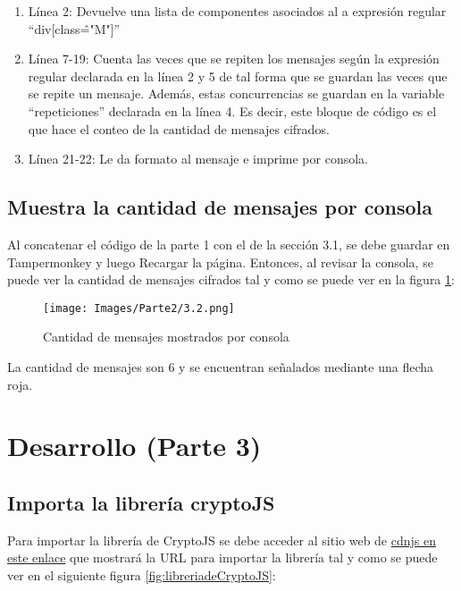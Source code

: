 \documentclass[letter,12pt]{article}
\begin{document}
\begin{enumerate}
    \item Línea 2: Devuelve una lista de componentes asociados al a expresión regular ``div[class\^ ="M"]''

    \item Línea 7-19: Cuenta las veces que se repiten los mensajes según la expresión regular declarada en la línea 2 y 5 de tal forma que se guardan las veces que se repite un mensaje. Además, estas concurrencias se guardan en la variable ``repeticiones'' declarada en la línea 4. Es decir, este bloque de código es el que hace el conteo de la cantidad de mensajes cifrados.

    \item Línea 21-22: Le da formato al mensaje e imprime por consola.
    
\end{enumerate}

\clearpage

\subsection{Muestra la cantidad de mensajes por consola}

Al concatenar el código de la parte 1 con el de la sección 3.1, se debe guardar en Tampermonkey y luego Recargar la página. Entonces, al revisar la consola, se puede ver la cantidad de mensajes cifrados tal y como se puede ver en la figura \ref{fig:Cantidaddemensajesmostradosporconsola}:

\begin{figure}[H]
    \centering
    \texttt{[image: Images/Parte2/3.2.png]}
    \caption{Cantidad de mensajes mostrados por consola}
    \label{fig:Cantidaddemensajesmostradosporconsola}
\end{figure}

La cantidad de mensajes son 6 y se encuentran señalados mediante una flecha roja.

\clearpage

\section{Desarrollo (Parte 3)}

\subsection{Importa la librería cryptoJS}

Para importar la librería de CryptoJS se debe acceder al sitio web de \href{https://cdnjs.com/libraries/crypto-js}{cdnjs en este enlace} que mostrará la URL para importar la librería tal y como se puede ver en el siguiente figura \ref{fig:libreriadeCryptoJS}:
\end{document}
